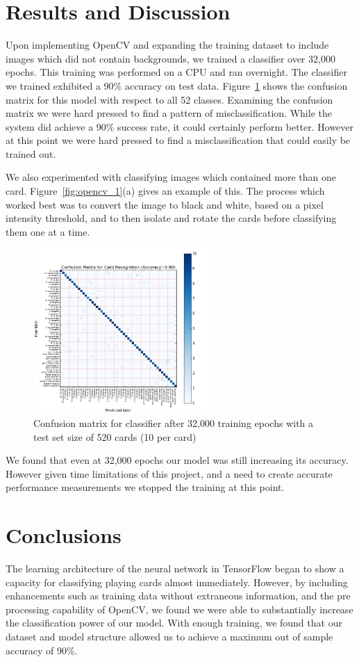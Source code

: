 \documentclass[letterpaper]{article}
\begin{document}
\section{Results and Discussion}
Upon implementing OpenCV and expanding the training dataset to include images which did not contain backgrounds, we trained a classifier over 32,000 epochs. This training was performed on a CPU and ran overnight. 
The classifier we trained exhibited a 90\% accuracy on test data. Figure~\ref{fig:confus} shows the confusion matrix for this model with respect to all 52 classes.  Examining the confusion matrix we were hard pressed to find a pattern of misclassification.  While the system did achieve a 90\% success rate, it could certainly perform better.  However at this point we were hard pressed to find a misclassification that could easily be trained out.

We also experimented with classifying images which contained more than one card. Figure~\ref{fig:opencv_1}(a) gives an example of this. The process which worked best was to convert the image to black and white, based on a pixel intensity threshold, and to then isolate and rotate the cards before classifying them one at a time.
\begin{figure}[!tbp]
  \centering
  \includegraphics[width=0.6\textwidth]{results/confusion2.jpg}
  \caption{\label{fig:confus}Confusion matrix for classifier after 32,000 training epochs with a test set size of 520 cards (10 per card)}
\end{figure}

We found that even at 32,000 epochs our model was still increasing its accuracy.  However given time limitations of this project, and a need to create accurate performance measurements we stopped the training at this point.

\section{Conclusions}
The learning architecture of the neural network in TensorFlow began to show a capacity for classifying playing cards almost immediately. However, by including enhancements such as training data without extraneous information, and the pre processing capability of OpenCV, we found we were able to substantially increase the classification power of our model. With enough training, we found that our dataset and model structure allowed us to achieve a maximum out of sample accuracy of 90\%. 
\end{document}
